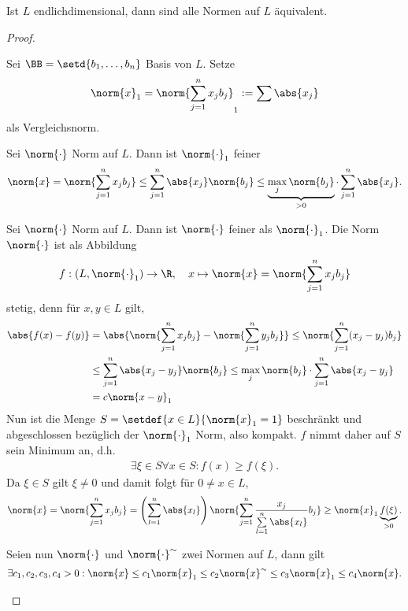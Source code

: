 \begin{prop}
\label{prop:1.11}
Ist $L$ endlichdimensional, dann sind alle Normen auf $L$ äquivalent.\fishhere
\end{prop}
\begin{proof}
\begin{proofenum}
  \item Sei $\BB=\setd{b_1,\ldots,b_n}$ Basis von $L$. Setze
\begin{align*}
\norm{x}_1 = \norm{\sum\limits_{j=1}^n x_j b_j}_1 := \sum \abs{x_j}
\end{align*}
als Vergleichsnorm.
\item Sei $\norm{\cdot}$ Norm auf $L$. Dann ist $\norm{\cdot}_1$ feiner
\begin{align*}
\norm{x} = \norm{\sum\limits_{j=1}^n x_j b_j} \le
\sum\limits_{j=1}^n \abs{x_j} \norm{b_j} \le
\underbrace{\max_j \norm{b_j}}_{>0} \cdot \sum\limits_{j=1}^n \abs{x_j}.
\end{align*}
\item Sei $\norm{\cdot}$ Norm auf $L$. Dann ist $\norm{\cdot}$ feiner als
$\norm{\cdot}_1$.
Die Norm $\norm{\cdot}$ ist als Abbildung
\begin{align*}
f : (L,\norm{\cdot}_1) \to \R, \quad x\mapsto \norm{x} =
\norm{\sum\limits_{j=1}^n x_j b_j}
\end{align*}
stetig, denn für $x,y\in L$ gilt,
\begin{align*}
\abs{f(x)-f(y)} &= 
\abs{\norm{\sum\limits_{j=1}^n x_j b_j}-\norm{\sum\limits_{j=1}^n y_j b_j}}
\le \norm{\sum\limits_{j=1}^n (x_j-y_j)b_j}\\ & \le
\sum\limits_{j=1}^n \abs{x_j-y_j}\norm{b_j} \le
\max_j \norm{b_j}\cdot\sum\limits_{j=1}^n \abs{x_j-y_j} \\ &= c \norm{x-y}_1
\end{align*}
Nun ist die Menge $S=\setdef{x\in L}{\norm{x}_1 = 1}$ beschränkt und
abgeschlossen bezüglich der $\norm{\cdot}_1$ Norm, also kompakt. $f$
nimmt daher auf $S$ sein Minimum an, d.h.
\begin{align*}
\exists \xi\in S \forall x\in S : f(x) \ge f(\xi). 
\end{align*}
Da $\xi\in S$ gilt $\xi\neq 0$ und damit folgt für $0\neq x\in L$,
\begin{align*}
\norm{x} = \norm{\sum\limits_{j=1}^n x_j b_j} = \left(\sum\limits_{l=1}^n
\abs{x_l}\right)
\norm{\sum\limits_{j=1}^n \frac{x_j}{\sum\limits_{l=1}^n \abs{x_l}}b_j}
\ge \norm{x}_1 \underbrace{f(\xi)}_{> 0}.
\end{align*}
\item Seien nun $\norm{\cdot}$ und $\norm{\cdot}^\sim$ zwei Normen auf $L$,
dann gilt
\begin{align*}
\exists c_1,c_2,c_3,c_4 > 0 :
\norm{x} \le c_1 \norm{x}_1 \le c_2 \norm{x}^\sim \le c_3 \norm{x}_1 \le c_4
\norm{x}.\qedhere
\end{align*}
\end{proofenum}
\end{proof}

